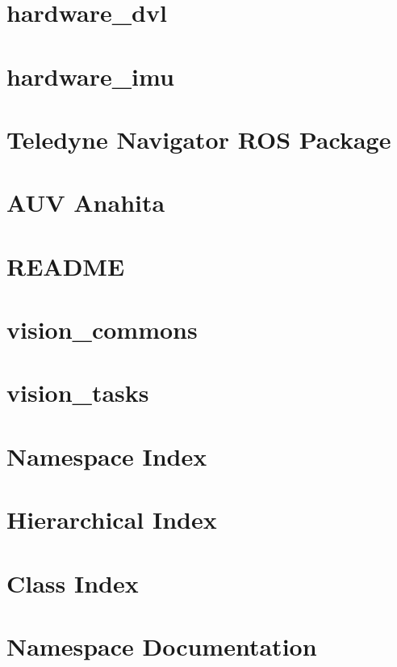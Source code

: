 \documentclass[twoside]{book}
\newcommand{\+}{\discretionary{\mbox{\scriptsize$\hookleftarrow$}}{}{}}
\begin{document}
\chapter{hardware\+\_\+dvl}
\label{autotoc_md58}

\chapter{hardware\+\_\+imu}
\label{autotoc_md60}

\chapter{Teledyne Navigator R\+OS Package}
\label{autotoc_md81}

\chapter{A\+UV Anahita}
\label{autotoc_md90}

\chapter{R\+E\+A\+D\+ME}
\label{md_vision_layer_image_undistort_README}

\chapter{vision\+\_\+commons}
\label{autotoc_md115}

\chapter{vision\+\_\+tasks}
\label{autotoc_md137}

\chapter{Namespace Index}

\chapter{Hierarchical Index}

\chapter{Class Index}

\chapter{Namespace Documentation}




\end{document}
